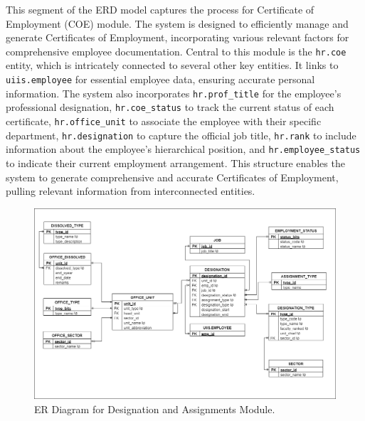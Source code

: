     This segment of the ERD model captures the process for Certificate of Employment (COE) module. The system is designed to efficiently manage and generate Certificates of Employment, incorporating various relevant factors for comprehensive employee documentation. Central to this module is the \texttt{hr.coe} entity, which is intricately connected to several other key entities. It links to \texttt{uiis.employee} for essential employee data, ensuring accurate personal information. The system also incorporates \texttt{hr.prof\_title} for the employee's professional designation, \texttt{hr.coe\_status} to track the current status of each certificate, \texttt{hr.office\_unit} to associate the employee with their specific department, \texttt{hr.designation} to capture the official job title, \texttt{hr.rank} to include information about the employee's hierarchical position, and \texttt{hr.employee\_status} to indicate their current employment arrangement. This structure enables the system to generate comprehensive and accurate Certificates of Employment, pulling relevant information from interconnected entities.

    \begin{figure}[H]
        \centering
        \includegraphics[width=1\linewidth]{figures/images/diagrams/erd/erd-core-office.png}
        \caption{ER Diagram for Designation and Assignments Module.}
        \label{fig:erd-core-office}
    \end{figure}

